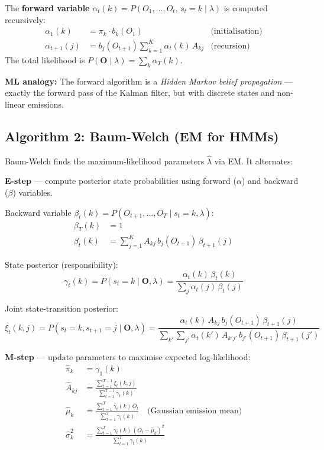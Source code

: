 \documentclass[12pt,a4paper,openany]{report}
\theoremstyle{definition}
\begin{document}
The \textbf{forward variable} $\alpha_t(k) = P(O_1, \ldots, O_t,\, s_t = k \mid \lambda)$ is computed recursively:
\begin{align}
  \alpha_1(k) &= \pi_k \cdot b_k(O_1) & \text{(initialisation)} \\
  \alpha_{t+1}(j) &= b_j(O_{t+1}) \sum_{k=1}^K \alpha_t(k)\, A_{kj} & \text{(recursion)}
\end{align}
The total likelihood is $P(\mathbf{O} \mid \lambda) = \sum_k \alpha_T(k)$.

\textbf{ML analogy:} The forward algorithm is a \emph{Hidden Markov belief propagation} — exactly the forward pass of the Kalman filter, but with discrete states and non-linear emissions.

\subsection{Algorithm 2: Baum-Welch (EM for HMMs)}

Baum-Welch finds the maximum-likelihood parameters $\hat{\lambda}$ via EM. It alternates:

\textbf{E-step} — compute posterior state probabilities using forward ($\alpha$) and backward ($\beta$) variables.

Backward variable $\beta_t(k) = P(O_{t+1}, \ldots, O_T \mid s_t = k, \lambda)$:
\begin{align}
  \beta_T(k) &= 1 \\
  \beta_t(k) &= \sum_{j=1}^K A_{kj}\, b_j(O_{t+1})\, \beta_{t+1}(j)
\end{align}

State posterior (responsibility):
\[
  \gamma_t(k) = P(s_t = k \mid \mathbf{O}, \lambda) = \frac{\alpha_t(k)\,\beta_t(k)}{\sum_{j} \alpha_t(j)\,\beta_t(j)}
\]

Joint state-transition posterior:
\[
  \xi_t(k, j) = P(s_t = k, s_{t+1} = j \mid \mathbf{O}, \lambda)
  = \frac{\alpha_t(k)\, A_{kj}\, b_j(O_{t+1})\, \beta_{t+1}(j)}{\sum_{k'}\sum_{j'} \alpha_t(k')\, A_{k'j'}\, b_{j'}(O_{t+1})\, \beta_{t+1}(j')}
\]

\textbf{M-step} — update parameters to maximise expected log-likelihood:
\begin{align}
  \hat{\pi}_k &= \gamma_1(k) \\
  \hat{A}_{kj} &= \frac{\sum_{t=1}^{T-1} \xi_t(k,j)}{\sum_{t=1}^{T-1} \gamma_t(k)} \\
  \hat{\mu}_k &= \frac{\sum_{t=1}^T \gamma_t(k)\, O_t}{\sum_{t=1}^T \gamma_t(k)} \quad \text{(Gaussian emission mean)} \\
  \hat{\sigma}_k^2 &= \frac{\sum_{t=1}^T \gamma_t(k)\,(O_t - \hat{\mu}_k)^2}{\sum_{t=1}^T \gamma_t(k)}
\end{align}
\end{document}
